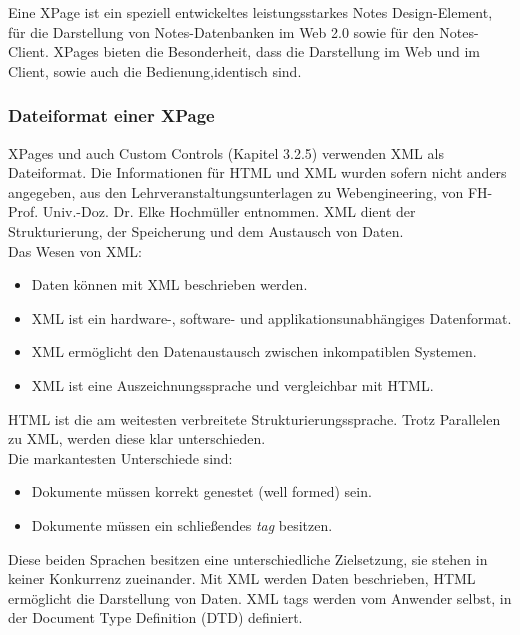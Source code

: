 Eine XPage ist ein speziell entwickeltes leistungsstarkes Notes Design-Element, für die \linebreak Darstellung von Notes-Datenbanken im Web
2.0 sowie für den Notes-Client. XPages bieten die Besonderheit, dass die Darstellung im
Web und im Client, sowie auch die Bedienung,\linebreak identisch sind\cite{donelly}.

\vspace{0.5cm}

\subsubsection{Dateiformat einer XPage}
\label{sec:4designelemente}

XPages und auch Custom Controls (Kapitel 3.2.5) verwenden XML als Dateiformat. Die \linebreak Informationen für HTML und XML
wurden sofern nicht anders angegeben,
aus den Lehrveranstaltungsunterlagen zu Webengineering, von FH-Prof. Univ.-Doz. Dr. Elke Hochmüller entnommen.
XML dient der Strukturierung, der Speicherung und dem Austausch von Daten.\\

 Das Wesen von XML:
\begin{itemize}
\item Daten können mit XML beschrieben werden.
\item XML ist ein hardware-, software- und applikationsunabhängiges Datenformat.
\item XML ermöglicht den Datenaustausch zwischen inkompatiblen Systemen. 
\item XML ist eine Auszeichnungssprache und vergleichbar mit HTML. 
\end{itemize}
HTML ist die am weitesten verbreitete Strukturierungssprache. Trotz Parallelen zu XML, \linebreak werden diese klar unterschieden.\\
\newline
Die markantesten Unterschiede sind:
\begin{itemize}
\item Dokumente müssen korrekt genestet (well formed) sein.
\item Dokumente müssen ein schließendes \textit{tag} besitzen.
\end{itemize}
Diese beiden Sprachen besitzen eine unterschiedliche Zielsetzung, sie stehen in keiner Konkurrenz zueinander.
Mit XML werden Daten beschrieben, HTML ermöglicht die Darstellung von Daten.
XML tags werden vom Anwender selbst, in der Document Type Definition (DTD) definiert.


